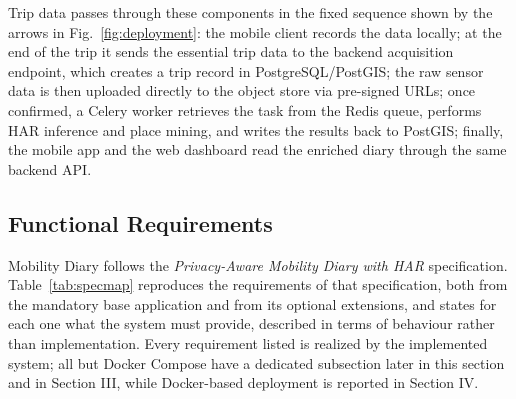 \documentclass[conference,a4paper]{IEEEtran}
\begin{document}
Trip data passes through these components in the fixed sequence shown by the arrows in Fig.~\ref{fig:deployment}: the mobile client records the data locally; at the end of the trip it sends the essential trip data to the backend acquisition endpoint, which creates a trip record in PostgreSQL/PostGIS; the raw sensor data is then uploaded directly to the object store via pre-signed URLs; once confirmed, a Celery worker retrieves the task from the Redis queue, performs HAR inference and place mining, and writes the results back to PostGIS; finally, the mobile app and the web dashboard read the enriched diary through the same backend API.



\subsection{Functional Requirements}
Mobility Diary follows the \textit{Privacy-Aware Mobility Diary with HAR} specification. Table~\ref{tab:specmap} reproduces the requirements of that specification, both from the mandatory base application and from its optional extensions, and states for each one what the system must provide, described in terms of behaviour rather than implementation. Every requirement listed is realized by the implemented system; all but Docker Compose have a dedicated subsection later in this section and in Section III, while Docker-based deployment is reported in Section IV.
\end{document}

